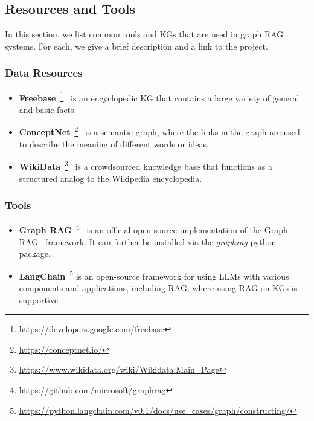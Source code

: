 \subsection{Resources and Tools} 

In this section, we list common tools and KGs that are used in graph RAG systems. For each, we give a brief description and a link to the project.

\subsubsection{Data Resources}
\begin{itemize}[leftmargin=*]
    \item {\bf Freebase}~\footnote{\href{https://developers.google.com/freebase}{https://developers.google.com/freebase}}~\cite{bollacker2008freebase} is an encyclopedic KG that contains a large variety of general and basic facts.
    \item {\bf ConceptNet}~\footnote{\href{https://conceptnet.io/}{https://conceptnet.io/}}~\cite{speer2017conceptnet} is a semantic graph, where the links in the graph are used to describe the meaning of different words or ideas.
    \item {\bf WikiData}~\footnote{\href{https://www.wikidata.org/wiki/Wikidata:Main\_Page}{https://www.wikidata.org/wiki/Wikidata:Main\_Page}}~\cite{vrandevcic2014wikidata} is a crowdsourced knowledge base that functions as a structured analog to the Wikipedia encyclopedia.
\end{itemize}

\subsubsection{ Tools}
\begin{itemize}[leftmargin=*]
    \item {\bf Graph RAG}~\footnote{\href{https://github.com/microsoft/graphrag}{https://github.com/microsoft/graphrag}}~\cite{edge2024local} is an official open-source implementation of the Graph RAG~\cite{edge2024local} framework. It can further be installed via the {\it graphrag} python package.
    \item {\bf LangChain}~\footnote{\href{https://python.langchain.com/v0.1/docs/use\_cases/graph/constructing/}{https://python.langchain.com/v0.1/docs/use\_cases/graph/constructing/}} is an open-source framework for using LLMs with various components and applications, including RAG, where using RAG on KGs is supportive. 
\end{itemize}

